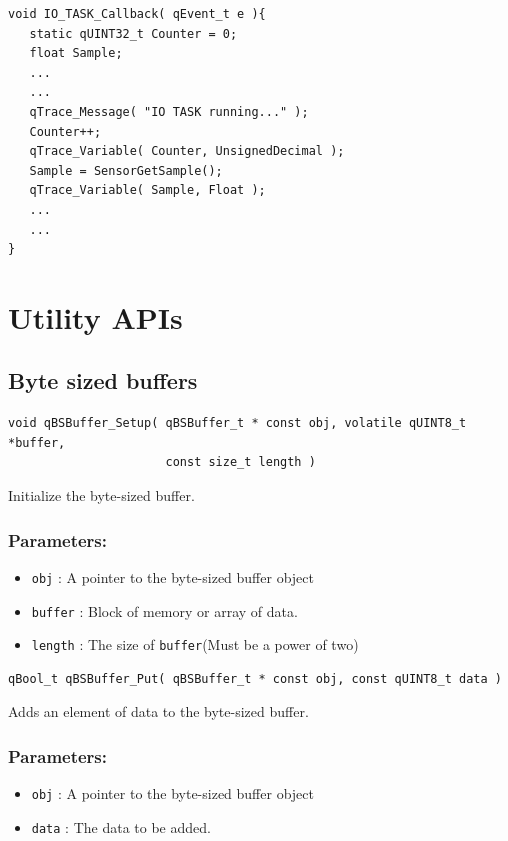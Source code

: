 \documentclass{article}
\begin{document}
\begin{lstlisting}[style=CStyle]
void IO_TASK_Callback( qEvent_t e ){
   static qUINT32_t Counter = 0;
   float Sample;
   ...
   ... 
   qTrace_Message( "IO TASK running..." );
   Counter++;
   qTrace_Variable( Counter, UnsignedDecimal );
   Sample = SensorGetSample();
   qTrace_Variable( Sample, Float );
   ...
   ...
}
\end{lstlisting}

\newpage
\section{Utility APIs}

\subsection{Byte sized buffers}

\begin{lstlisting}[style=CStyle]
void qBSBuffer_Setup( qBSBuffer_t * const obj, volatile qUINT8_t *buffer, 
                      const size_t length )
\end{lstlisting}

Initialize the byte-sized buffer. 

\subsubsection*{Parameters:}
\begin{itemize}
    \item \lstinline{obj} : A pointer to the byte-sized buffer object
    \item \lstinline{buffer} : Block of memory or array of data.
    \item \lstinline{length} : The size of \lstinline{buffer}(Must be a power of two)
\end{itemize}

\noindent\hrulefill

\begin{lstlisting}[style=CStyle]
qBool_t qBSBuffer_Put( qBSBuffer_t * const obj, const qUINT8_t data )
\end{lstlisting}

Adds an element of data to the byte-sized buffer. 

\subsubsection*{Parameters:}
\begin{itemize}
    \item \lstinline{obj} : A pointer to the byte-sized buffer object
    \item \lstinline{data} : The data to be added.
\end{itemize}
\end{document}
